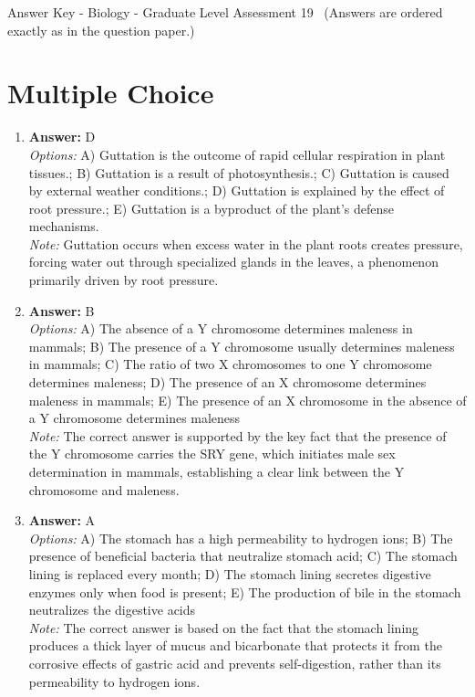\documentclass[12pt]{article}
\begin{document}
\begin{center}
Answer Key - Biology - Graduate Level Assessment 19 \
\small (Answers are ordered exactly as in the question paper.)
\end{center}

\section*{Multiple Choice}
\begin{enumerate}[label=\arabic*.]
\item \textbf{Answer:} D
\\ \textit{Options:} A) Guttation is the outcome of rapid cellular respiration in plant tissues.; B) Guttation is a result of photosynthesis.; C) Guttation is caused by external weather conditions.; D) Guttation is explained by the effect of root pressure.; E) Guttation is a byproduct of the plant's defense mechanisms.
\\ \textit{Note:} Guttation occurs when excess water in the plant roots creates pressure, forcing water out through specialized glands in the leaves, a phenomenon primarily driven by root pressure.
\item \textbf{Answer:} B
\\ \textit{Options:} A) The absence of a Y chromosome determines maleness in mammals; B) The presence of a Y chromosome usually determines maleness in mammals; C) The ratio of two X chromosomes to one Y chromosome determines maleness; D) The presence of an X chromosome determines maleness in mammals; E) The presence of an X chromosome in the absence of a Y chromosome determines maleness
\\ \textit{Note:} The correct answer is supported by the key fact that the presence of the Y chromosome carries the SRY gene, which initiates male sex determination in mammals, establishing a clear link between the Y chromosome and maleness.
\item \textbf{Answer:} A
\\ \textit{Options:} A) The stomach has a high permeability to hydrogen ions; B) The presence of beneficial bacteria that neutralize stomach acid; C) The stomach lining is replaced every month; D) The stomach lining secretes digestive enzymes only when food is present; E) The production of bile in the stomach neutralizes the digestive acids
\\ \textit{Note:} The correct answer is based on the fact that the stomach lining produces a thick layer of mucus and bicarbonate that protects it from the corrosive effects of gastric acid and prevents self-digestion, rather than its permeability to hydrogen ions.

\end{enumerate}
\end{document}
